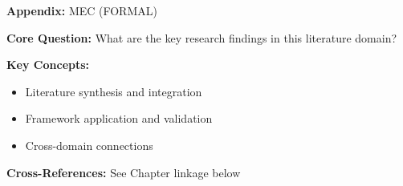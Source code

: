 
\begin{tcolorbox}[colback=blue!5!white, colframe=blue!75!black,
    title=Quick Reference: Appendix MEC]
\textbf{Appendix:} MEC (FORMAL)

\textbf{Core Question:} What are the key research findings in this literature domain?

\textbf{Key Concepts:}
\begin{itemize}[nosep]
\item Literature synthesis and integration
\item Framework application and validation
\item Cross-domain connections
\end{itemize}

\textbf{Cross-References:} See Chapter linkage below
\end{tcolorbox}


\begin{abstract}
This appendix provides a systematic review and integration of key research findings
in the FORMAL domain. It synthesizes literature relevant to the Evidence-Based
Framework (EBF) and identifies connections to the 10C CORE architecture.
\end{abstract}



